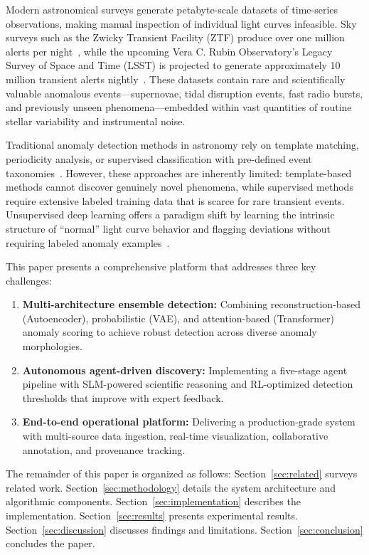 \documentclass[conference]{IEEEtran}
\begin{document}
Modern astronomical surveys generate petabyte-scale datasets of time-series observations, making manual inspection of individual light curves infeasible. Sky surveys such as the Zwicky Transient Facility (ZTF) produce over one million alerts per night~\cite{bellm2019ztf}, while the upcoming Vera C. Rubin Observatory's Legacy Survey of Space and Time (LSST) is projected to generate approximately 10 million transient alerts nightly~\cite{ivezic2019lsst}. These datasets contain rare and scientifically valuable anomalous events---supernovae, tidal disruption events, fast radio bursts, and previously unseen phenomena---embedded within vast quantities of routine stellar variability and instrumental noise.

Traditional anomaly detection methods in astronomy rely on template matching, periodicity analysis, or supervised classification with pre-defined event taxonomies~\cite{nun2015fats}. However, these approaches are inherently limited: template-based methods cannot discover genuinely novel phenomena, while supervised methods require extensive labeled training data that is scarce for rare transient events. Unsupervised deep learning offers a paradigm shift by learning the intrinsic structure of ``normal'' light curve behavior and flagging deviations without requiring labeled anomaly examples~\cite{baron2019machine}.

This paper presents a comprehensive platform that addresses three key challenges:

\begin{enumerate}
    \item \textbf{Multi-architecture ensemble detection:} Combining reconstruction-based (Autoencoder), probabilistic (VAE), and attention-based (Transformer) anomaly scoring to achieve robust detection across diverse anomaly morphologies.
    \item \textbf{Autonomous agent-driven discovery:} Implementing a five-stage agent pipeline with SLM-powered scientific reasoning and RL-optimized detection thresholds that improve with expert feedback.
    \item \textbf{End-to-end operational platform:} Delivering a production-grade system with multi-source data ingestion, real-time visualization, collaborative annotation, and provenance tracking.
\end{enumerate}

The remainder of this paper is organized as follows: Section~\ref{sec:related} surveys related work. Section~\ref{sec:methodology} details the system architecture and algorithmic components. Section~\ref{sec:implementation} describes the implementation. Section~\ref{sec:results} presents experimental results. Section~\ref{sec:discussion} discusses findings and limitations. Section~\ref{sec:conclusion} concludes the paper.
\end{document}
